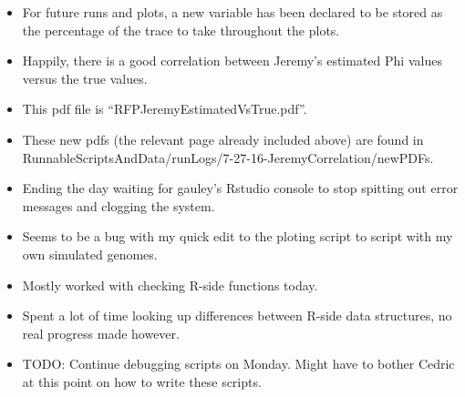 \documentclass[12pt,hyperref]{labbook}
\newcommand{\sep}{\discretionary{}{}{}} %
\begin{document}
\begin{itemize}
    \item For future runs and plots, a new variable has been declared to be stored as the percentage of the trace to take throughout the plots.
    \item Happily, there is a good correlation between Jeremy's estimated Phi values versus the true values.
    
    \item This pdf file is \enquote{RFP\sep Jeremy\sep Estimated\sep Vs\sep True\sep .\sep pdf}.
    \item These new pdfs (the relevant page already included above) are found in Runnable\sep Scripts\sep And\sep Data\sep /\sep run\sep Logs\sep /\sep 7-27-16\sep -\sep Jeremy\sep Correlation\sep /\sep new\sep PDFs.
    \item Ending the day waiting for gauley's Rstudio console to stop spitting out error messages and clogging the system.
    \item Seems to be a bug with my quick edit to the ploting script to script with my own simulated genomes.
\end{itemize}


\begin{itemize}
    \item Mostly worked with checking R-side functions today.
    \item Spent a lot of time looking up differences between R-side data structures, no real progress made however.
    \item TODO: Continue debugging scripts on Monday.
    Might have to bother Cedric at this point on how to write these scripts.
\end{itemize}

\end{document}
